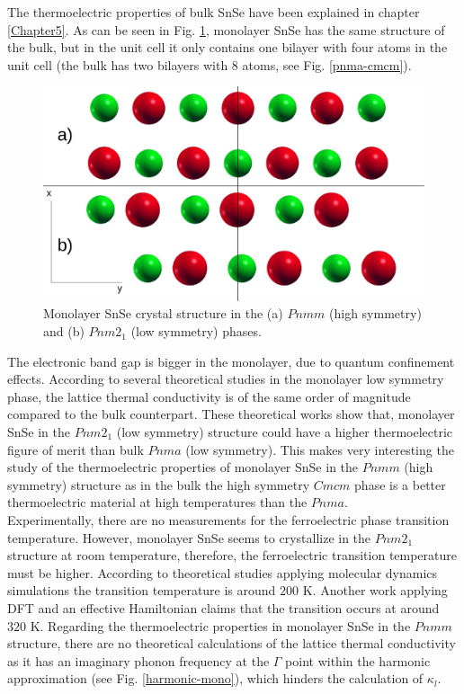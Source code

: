 The thermoelectric properties of bulk SnSe have been explained in chapter \ref{Chapter5}. As can be seen in 
Fig. \ref{pnma-cmcm-mono}, monolayer SnSe has the same structure of the bulk, but in the unit cell 
it only contains one bilayer with four atoms in the unit cell (the bulk has two bilayers with 8 atoms, see 
Fig. \ref{pnma-cmcm}). 
\begin{figure}[h]
\begin{center}
\includegraphics[width=0.8\linewidth]{Figures/monolayer-structure.pdf}
	\caption[Monolayer SnSe crystal structure]{Monolayer SnSe crystal structure in the (a) $Pnmm$ (high symmetry) 
	and (b) $Pnm2_{1}$ (low symmetry) phases.}
\label{pnma-cmcm-mono}
\end{center}
\end{figure}
The electronic band gap is bigger in the monolayer\cite{wang2015thermoelectric,hu2017high}, due to quantum 
confinement effects. According to several theoretical studies\cite{wang2015thermoelectric,hu2017high} in the 
monolayer low symmetry phase, the lattice thermal conductivity is of the same order of magnitude compared to the 
bulk counterpart. These theoretical works show that, monolayer SnSe in the $Pnm2_{1}$ (low symmetry) structure could 
have a higher thermoelectric figure of merit\cite{wang2015thermoelectric,hu2017high} than bulk $Pnma$ (low symmetry). This makes very interesting the study of the thermoelectric properties of monolayer SnSe in the $Pnmm$ (high 
symmetry) structure as in the bulk the high symmetry $Cmcm$ phase is a better thermoelectric material at high 
temperatures than the $Pnma$. \\

Experimentally, there are no measurements for the ferroelectric phase transition temperature. However, monolayer 
SnSe seems to crystallize in the $Pnm2_{1}$ structure at room temperature\cite{li2013single,chang2020controlled}, 
therefore, the ferroelectric transition temperature must be higher. According to theoretical studies applying 
molecular dynamics simulations\cite{mehboudi2016structural,barraza2018tuning} the transition temperature is around 
$200$ K. Another work applying DFT and an effective Hamiltonian claims\cite{fei2016ferroelectricity} that the 
transition occurs at around $320$ K. Regarding the thermoelectric properties in monolayer SnSe in the $Pnmm$ 
structure, there are no theoretical calculations of the lattice thermal conductivity as it has an imaginary phonon 
frequency at the $\Gamma$ point within the harmonic approximation (see Fig. \ref{harmonic-mono}), which hinders the 
calculation of $\kappa_{l}$. \\

